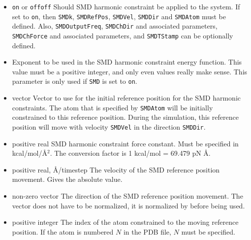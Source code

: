 \begin{itemize}

\item 
{}
{{\tt on} or {\tt off}}{{\tt off}}
{Should SMD harmonic constraint be applied to the system. If set 
to {\tt on}, then  {\tt SMDk}, {\tt SMDRefPos}, {\tt SMDVel},
{\tt SMDDir} and {\tt SMDAtom} must be defined. Also,
{\tt SMDOutputFreq}, {\tt SMDChDir} and associated parameters,
{\tt SMDChForce} and associated parameters, and {\tt SMDTStamp} can
be optionally defined.}

\item
{}
{Exponent to be used in the SMD harmonic constraint energy function.
This value must be a positive integer, and only even values really make
sense.  This parameter is only used if {\tt SMD} is set to 
{\tt on}.}

\item
{}
{vector} {Vector to use for the initial reference position for the SMD
harmonic constraints. The atom that is specified by {\tt SMDAtom}
will be initially constrained to this reference position. During the
simulation, this reference position will move with velocity
{\tt SMDVel} in the direction {\tt SMDDir}.}

\item
{}
{positive real}
{SMD harmonic constraint force constant. Must be specified in
kcal/mol/\AA$^2$. The conversion factor is 1 kcal/mol = 69.479 pN \AA.} 

\item
{}
{positive real, \AA/timestep}
{The velocity of the SMD reference position movement. Gives the absolute
value.}

\item
{}
{non-zero vector}
{The direction of the SMD reference position movement. The vector does
not have to be normalized, it is normalized by \NAMD before being used.}

\item
{}
{positive integer}
{The index of the atom constrained to the moving reference position. 
If the atom is numbered $N$ in the PDB file, $N$ must be specified.
}


\end{itemize}
